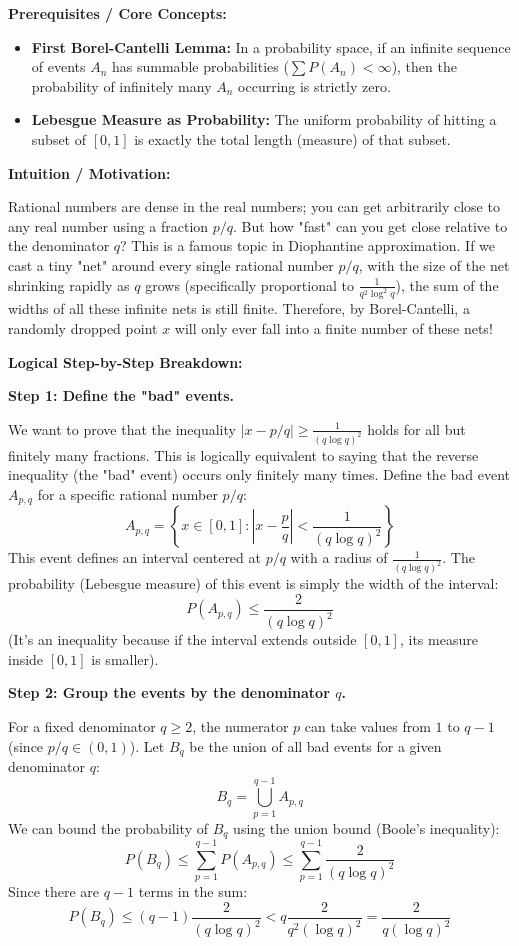 \begin{solution}
\textbf{Prerequisites / Core Concepts:}
\begin{itemize}
    \item \textbf{First Borel-Cantelli Lemma:} In a probability space, if an infinite sequence of events $A_n$ has summable probabilities ($\sum P(A_n) < \infty$), then the probability of infinitely many $A_n$ occurring is strictly zero.
    \item \textbf{Lebesgue Measure as Probability:} The uniform probability of hitting a subset of $[0,1]$ is exactly the total length (measure) of that subset.
\end{itemize}

\textbf{Intuition / Motivation:}

Rational numbers are dense in the real numbers; you can get arbitrarily close to any real number using a fraction $p/q$. But how "fast" can you get close relative to the denominator $q$? This is a famous topic in Diophantine approximation. If we cast a tiny "net" around every single rational number $p/q$, with the size of the net shrinking rapidly as $q$ grows (specifically proportional to $\frac{1}{q^2 \log^2 q}$), the sum of the widths of all these infinite nets is still finite. Therefore, by Borel-Cantelli, a randomly dropped point $x$ will only ever fall into a finite number of these nets!

\textbf{Logical Step-by-Step Breakdown:}

\textbf{Step 1: Define the "bad" events.}

We want to prove that the inequality $|x - p/q| \geq \frac{1}{(q \log q)^2}$ holds for all but finitely many fractions.
This is logically equivalent to saying that the reverse inequality (the "bad" event) occurs only finitely many times.
Define the bad event $A_{p,q}$ for a specific rational number $p/q$:
\[ A_{p,q} = \left\{ x \in [0, 1] : \left| x - \frac{p}{q} \right| < \frac{1}{(q \log q)^2} \right\} \]
This event defines an interval centered at $p/q$ with a radius of $\frac{1}{(q \log q)^2}$.
The probability (Lebesgue measure) of this event is simply the width of the interval:
\[ P(A_{p,q}) \leq \frac{2}{(q \log q)^2} \]
(It's an inequality because if the interval extends outside $[0,1]$, its measure inside $[0,1]$ is smaller).

\textbf{Step 2: Group the events by the denominator $q$.}

For a fixed denominator $q \geq 2$, the numerator $p$ can take values from $1$ to $q-1$ (since $p/q \in (0, 1)$).
Let $B_q$ be the union of all bad events for a given denominator $q$:
\[ B_q = \bigcup_{p=1}^{q-1} A_{p,q} \]
We can bound the probability of $B_q$ using the union bound (Boole's inequality):
\[ P(B_q) \leq \sum_{p=1}^{q-1} P(A_{p,q}) \leq \sum_{p=1}^{q-1} \frac{2}{(q \log q)^2} \]
Since there are $q-1$ terms in the sum:
\[ P(B_q) \leq (q-1) \frac{2}{(q \log q)^2} < q \frac{2}{q^2 (\log q)^2} = \frac{2}{q (\log q)^2} \]


\end{solution}
